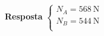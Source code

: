 \textbf{Resposta}
$
\begin{cases}
	N_{A}=\SI{568}{\newton}\\
	N_{B}=\SI{544}{\newton}\\
\end{cases}
$